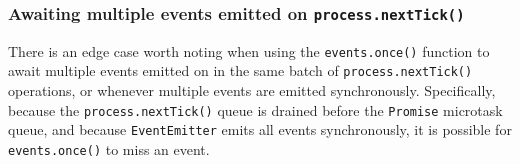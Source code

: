 \subsubsection{\texorpdfstring{Awaiting multiple events emitted on
\texttt{process.nextTick()}}{Awaiting multiple events emitted on process.nextTick()}}\label{awaiting-multiple-events-emitted-on-process.nexttick}

There is an edge case worth noting when using the \texttt{events.once()}
function to await multiple events emitted on in the same batch of
\texttt{process.nextTick()} operations, or whenever multiple events are
emitted synchronously. Specifically, because the
\texttt{process.nextTick()} queue is drained before the \texttt{Promise}
microtask queue, and because \texttt{EventEmitter} emits all events
synchronously, it is possible for \texttt{events.once()} to miss an
event.

